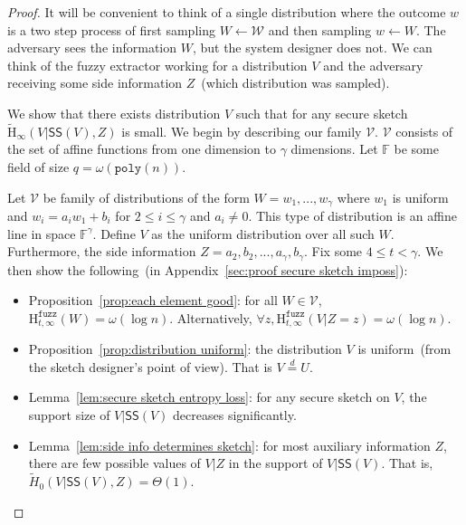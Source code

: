 \documentclass[11pt]{article}
\newcommand{\apref}[1]{\mbox{Appendix~\ref{#1}}}
\newcommand{\lemref}[1]{\mbox{Lemma~\ref{#1}}}
\newcommand{\propref}[1]{\mbox{Proposition~\ref{#1}}}
\newcommand{\class}[1]{{\ensuremath{\mathsf{#1}}}}
\newcommand{\sketch}{\ensuremath{\class{SS}}\xspace}
\newcommand{\poly}{\ensuremath{\mathtt{poly}}\xspace}
\newcommand{\Hav}{\tilde{\mathrm{H}}_\infty}
\newcommand{\Hfuzz}{\mathrm{H}^{\mathtt{fuzz}}_{t,\infty}}
\begin{document}
\begin{proof}
It will be convenient to think of a single distribution where the outcome $w$ is a two step process of first sampling $W\leftarrow \mathcal{W}$ and then sampling $w\leftarrow W$.  The adversary sees the information $W$, but the system designer does not.  We can think of the fuzzy extractor working for a distribution $V$ and the adversary receiving some side information $Z$~(which distribution was sampled).  

We show that there exists distribution $V$ such that for any secure sketch $\Hav(V | \sketch(V), Z)$ is small.  We begin by describing our family $\mathcal{V}$.  $\mathcal{V}$ consists of the set of affine functions from one dimension to $\gamma$ dimensions.  %
Let $\mathbb{F}$ be some field of size $q =\omega(\poly(n))$.  

Let $\mathcal{V}$ be family of distributions of the form $W = w_1,..., w_\gamma$ where $w_1$ is uniform and $w_i = a_i w_1 + b_i$ for $2\le i \le \gamma$ and $a_i\neq 0$.  This type of distribution is an affine line in space $\mathbb{F}^\gamma$.  Define $V$ as the uniform distribution over all such $W$.  Furthermore, the side information $Z = a_2, b_2, ..., a_\gamma, b_\gamma$. Fix some $4\le t < \gamma$.
We then show the following~(in \apref{sec:proof secure sketch imposs}):

\begin{itemize}
\item \propref{prop:each element good}: for all $W\in \mathcal{V}$, $\Hfuzz(W) = \omega (\log n)$. Alternatively, $\forall z, \Hfuzz(V | Z=z) = \omega(\log n)$.
\item \propref{prop:distribution uniform}: the distribution $V$ is uniform~(from the sketch designer's point of view).  That is $V\overset{d}=U$.
\item \lemref{lem:secure sketch entropy loss}: for any secure sketch on $V$, the support size of $V | \sketch(V)$ decreases significantly.
\item \lemref{lem:side info determines sketch}:  for most auxiliary information $Z$, there are few possible values of $V|Z$ in the support of $V | \sketch(V)$.  That is, $\tilde{H}_0(V | \sketch(V), Z) = \Theta(1)$.
\end{itemize}
\end{proof}
\end{document}
